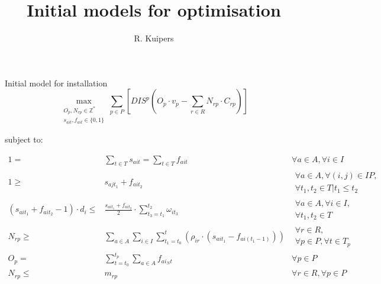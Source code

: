 \documentclass{beamer}
\title[Initial models for optimisation]{Initial models for optimisation}
\author{R. Kuipers}
\begin{document}
\begin{frame}
  \titlepage
\end{frame}

\begin{frame}{Initial model for installation}
\scriptsize
\begin{equation}
	\max_{\substack{O_p, N_{rp} \in \mathbb{Z}^* \\
	s_{ait}, f_{ait} \in \{0, 1\}}} 
	\sum_{p \in P} [ DIS^p (O_p \cdot v_p - \sum_{r \in R} N_{rp} \cdot C_{rp}) ]
\end{equation}

\bigskip
subject to:

\begin{align}
1 =& \sum_{t \in T} s_{ait}= \sum_{t \in T} f_{ait}									&	\forall a \in A, \forall i \in I 					\\
1 \geq& s_{ajt_1} + f_{ait_2}												&	\begin{aligned} \forall a \in A, \forall (i, j) \in IP, \\
																	\forall t_1, t_2 \in T | t_1 \leq t_2 \end{aligned} \\
(s_{ait_1} + f_{ait_2} - 1) \cdot d_i \leq& \frac{s_{ait_1} + f_{ait_2}}{2} \cdot \sum_{t_3 = t_1}^{t_2} \omega_{it_3} & \begin{aligned}\forall a \in A, \forall i \in I, \\ \forall t_1, t_2 \in T \end{aligned} \\
N_{rp} \geq& \sum_{a \in A}\sum_{i\in I} \sum_{t_1 = t_0}^t (\rho_{ir} \cdot (s_{ait_1} - f_{ai(t_1-1)}))	& 	\begin{aligned} \forall r \in R, \\ \forall p \in P, \forall t \in T_p \end{aligned} 	\\
O_p =&  \sum_{t = t_0}^{t_p} \sum_{a \in A}  f_{ai_Nt}								& \forall p \in P\\
N_{rp} \leq& m_{rp}													& \forall r \in R, \forall p \in P
\end{align}

\end{frame}
\end{document}
